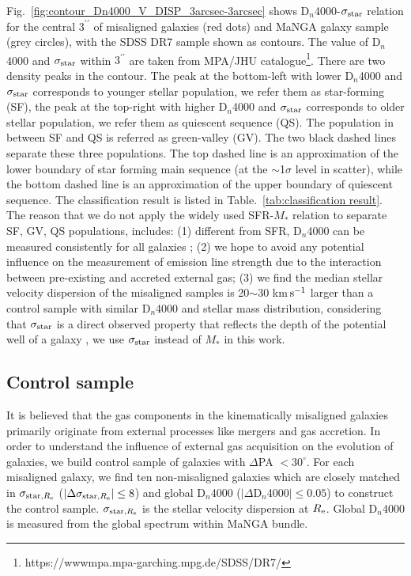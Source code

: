 Fig.~\ref{fig:contour_Dn4000_V_DISP_3arcsec-3arcsec} shows D$_n$4000-${\sigma}_{\rm star}$ relation for the central $3^{\prime \prime}$ of misaligned galaxies (red dots) and MaNGA galaxy sample (grey circles), with the SDSS DR7 sample shown as contours. The value of D$_n$4000 and ${\sigma}_{\rm star}$ within $3^{\prime \prime}$ are taken from MPA/JHU catalogue\footnote{https://wwwmpa.mpa-garching.mpg.de/SDSS/DR7/}. There are two density peaks in the contour. The peak at the bottom-left with lower D$_n$4000 and $\sigma_{\rm star}$ corresponds to younger stellar population, we refer them as star-forming (SF), the peak at the top-right with higher D$_n$4000 and $\sigma_{\rm star}$ corresponds to older stellar population, we refer them as quiescent sequence (QS). The population in between SF and QS is referred as green-valley (GV). The two black dashed lines separate these three populations. The top dashed line is an approximation of the lower boundary of star forming main sequence (at the $\sim$1$\sigma$ level in scatter), while the bottom dashed line is an approximation of the upper boundary of quiescent sequence. The classification result is listed in Table.~\ref{tab:classification result}. The reason that we do not apply the widely used SFR-$M_*$ relation to separate SF, GV, QS populations, includes: (1) different from SFR, D$_n$4000 can be measured consistently for all galaxies \citep{chen_post-starburst_2019}; (2) we hope to avoid any potential influence on the measurement of emission line strength due to the interaction between pre-existing and accreted external gas; (3) we find the median stellar velocity dispersion of the misaligned samples is 20$\sim$30 km$\rm \, s^{-1}$ larger than a control sample with similar D$_n$4000 and stellar mass distribution, considering that $\sigma_{\rm star}$ is a direct observed property that reflects the depth of the potential well of a galaxy \citep{2000ApJ...539L...9F, gebhardt2000relationship}, we use $\sigma_{\rm star}$ instead of $M_*$ in this work.

\subsection{Control sample}

It is believed that the gas components in the kinematically misaligned galaxies primarily originate from external processes like mergers and gas accretion. In order to understand the influence of external gas acquisition on the evolution of galaxies, we build control sample of galaxies with $\Delta$PA $< 30^{\circ}$. For each misaligned galaxy, we find ten non-misaligned galaxies which are closely matched in $\sigma_{{\rm star}, R_{\rm e}}$ ($|\Delta{\sigma}_{{\rm star}, R_{\rm e}}| \leq 8$) and global D$_n$4000 ($|\Delta$D$_n$4000$| \leq 0.05$) to construct the control sample. $\sigma_{{\rm star}, R_{\rm e}}$ is the stellar velocity dispersion at $R_{\rm e}$. Global D$_n$4000 is measured from the global spectrum within MaNGA bundle.

